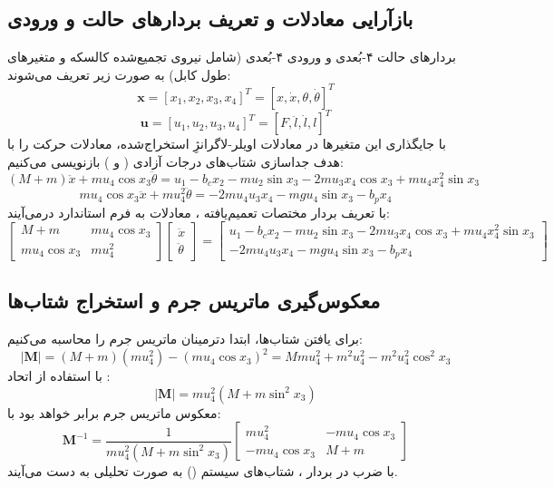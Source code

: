 \subsection{بازآرایی معادلات و تعریف بردارهای حالت و ورودی}
بردارهای حالت ۴-بُعدی و ورودی ۴-بُعدی (شامل نیروی تجمیع‌شده کالسکه  و متغیرهای طول کابل) به صورت زیر تعریف می‌شوند:
\[
    \mathbf{x} = [x_1, x_2, x_3, x_4]^T = [x, \dot{x}, \theta, \dot{\theta}]^T
\]
\[
    \mathbf{u} = [u_1, u_2, u_3, u_4]^T = [F, \ddot{l}, \dot{l}, l]^T
\]
با جایگذاری این متغیرها در معادلات اویلر-لاگرانژِ استخراج‌شده، معادلات حرکت را با هدف جداسازی شتاب‌های درجات آزادی ( و \lr{$\ddot{\theta}$}) بازنویسی می‌کنیم:
\[
    (M+m)\ddot{x} + m u_4\cos x_3 \ddot{\theta} = u_1 - b_c x_2 - m u_2\sin x_3 - 2m u_3 x_4\cos x_3 + m u_4 x_4^2\sin x_3
\]
\[
    m u_4\cos x_3 \ddot{x} + m u_4^2 \ddot{\theta} = -2m u_4 u_3 x_4 - mg u_4\sin x_3 - b_p x_4
\]
با تعریف بردار مختصات تعمیم‌یافته ، معادلات به فرم استاندارد  درمی‌آیند:
\[
    \begin{bmatrix}
        M+m           & m u_4\cos x_3 \\
        m u_4\cos x_3 & m u_4^2
    \end{bmatrix}
    \begin{bmatrix}
        \ddot{x} \\ \ddot{\theta}
    \end{bmatrix}
    =
    \begin{bmatrix}
        u_1 - b_c x_2 - m u_2\sin x_3 - 2m u_3 x_4\cos x_3 + m u_4 x_4^2\sin x_3 \\
        -2m u_4 u_3 x_4 - mg u_4\sin x_3 - b_p x_4
    \end{bmatrix}
\]

\subsection{معکوس‌گیری ماتریس جرم و استخراج شتاب‌ها}
برای یافتن شتاب‌ها، ابتدا دترمینان ماتریس جرم  را محاسبه می‌کنیم:
\[
    |\mathbf{M}| = (M+m)(m u_4^2) - (m u_4\cos x_3)^2 = M m u_4^2 + m^2 u_4^2 - m^2 u_4^2\cos^2 x_3
\]
با استفاده از اتحاد :
\[
    |\mathbf{M}| = m u_4^2(M + m\sin^2 x_3)
\]
معکوس ماتریس جرم برابر خواهد بود با:
\[
    \mathbf{M}^{-1} = \frac{1}{m u_4^2(M + m\sin^2 x_3)}
    \begin{bmatrix}
        m u_4^2        & -m u_4\cos x_3 \\
        -m u_4\cos x_3 & M+m
    \end{bmatrix}
\]
با ضرب  در بردار ، شتاب‌های سیستم () به صورت تحلیلی به دست می‌آیند.

